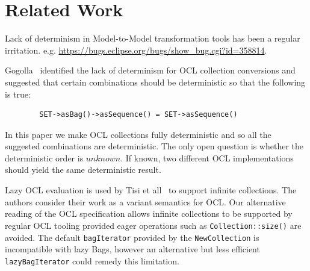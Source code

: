 \documentclass{llncs}
\begin{document}






\section{Related Work}\label{Related Work}

Lack of determinism in Model-to-Model transformation tools has been a regular irritation. e.g. \url{https://bugs.eclipse.org/bugs/show\_bug.cgi?id=358814}.  

Gogolla~\cite{OCL-Determinism} identified the lack of determinism for OCL collection conversions and suggested that certain combinations should be deterministic so that the following is true:
\begin{verbatim}
        SET->asBag()->asSequence() = SET->asSequence()
\end{verbatim}
In this paper we make OCL collections fully deterministic and so all the suggested combinations are deterministic. The only open question is whether the deterministic order is $unknown$. If known, two different OCL implementations should yield the same deterministic result. 

Lazy OCL evaluation is used by Tisi et all~\cite{Lazy OCL} to support infinite collections. The authors consider their work as a variant semantics for OCL. Our alternative reading of the OCL specification allows infinite collections to be supported by regular OCL tooling provided eager operations such as \verb$Collection::size()$ are avoided. The default \verb$bagIterator$ provided by the \verb$NewCollection$ is incompatible with lazy Bags, however an alternative but less efficient \verb$lazyBagIterator$ could remedy this limitation.   
\end{document}

